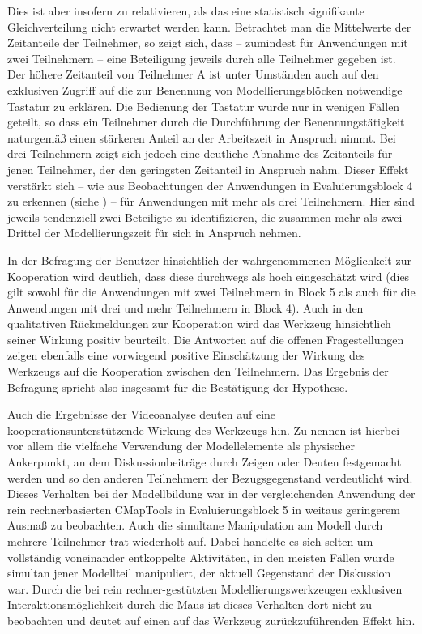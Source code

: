 Dies ist aber insofern zu relativieren, als das eine statistisch signifikante Gleichverteilung nicht erwartet werden kann. Betrachtet man die Mittelwerte der Zeitanteile der Teilnehmer, so zeigt sich, dass -- zumindest für Anwendungen mit zwei Teilnehmern -- eine Beteiligung jeweils durch alle Teilnehmer gegeben ist. Der höhere Zeitanteil von Teilnehmer A ist unter Umständen auch auf den exklusiven Zugriff auf die zur Benennung von Modellierungsblöcken notwendige Tastatur zu erklären. Die Bedienung der Tastatur wurde nur in wenigen Fällen geteilt, so dass ein Teilnehmer durch die Durchführung der Benennungstätigkeit naturgemäß einen stärkeren Anteil an der Arbeitszeit in Anspruch nimmt. Bei drei Teilnehmern zeigt sich jedoch eine deutliche Abnahme des Zeitanteils für jenen Teilnehmer, der den geringsten Zeitanteil in Anspruch nahm. Dieser Effekt verstärkt sich -- wie aus Beobachtungen der Anwendungen in Evaluierungsblock 4 zu erkennen (siehe \citep{Wahlmuller10}) -- für Anwendungen mit mehr als drei Teilnehmern. Hier sind jeweils tendenziell zwei Beteiligte zu identifizieren, die zusammen mehr als zwei Drittel der Modellierungszeit für sich in Anspruch nehmen.  

In der Befragung der Benutzer hinsichtlich der wahrgenommenen Möglichkeit zur Kooperation wird deutlich, dass diese durchwegs als hoch eingeschätzt wird (dies gilt sowohl für die Anwendungen mit zwei Teilnehmern in Block 5 als auch für die Anwendungen mit drei und mehr Teilnehmern in Block 4). Auch in den qualitativen Rückmeldungen zur Kooperation wird das Werkzeug hinsichtlich seiner Wirkung positiv beurteilt. Die Antworten auf die offenen Fragestellungen zeigen ebenfalls eine vorwiegend positive Einschätzung der Wirkung des Werkzeugs auf die Kooperation zwischen den Teilnehmern. Das Ergebnis der Befragung spricht also insgesamt für die Bestätigung der Hypothese.

Auch die Ergebnisse der Videoanalyse deuten auf eine kooperationsunterstützende Wirkung des Werkzeugs hin. Zu nennen ist hierbei vor allem die vielfache Verwendung der Modellelemente als physischer Ankerpunkt, an dem Diskussionbeiträge durch Zeigen oder Deuten festgemacht werden und so den anderen Teilnehmern der Bezugsgegenstand verdeutlicht wird. Dieses Verhalten bei der Modellbildung war in der vergleichenden Anwendung der rein rechnerbasierten CMapTools in Evaluierungsblock 5 in weitaus geringerem Ausmaß zu beobachten. Auch die simultane Manipulation am Modell durch mehrere Teilnehmer trat wiederholt auf. Dabei handelte es sich selten um vollständig voneinander entkoppelte Aktivitäten, in den meisten Fällen wurde simultan jener Modellteil manipuliert, der aktuell Gegenstand der Diskussion war. Durch die bei rein rechner-gestützten Modellierungswerkzeugen exklusiven Interaktionsmöglichkeit durch die Maus ist dieses Verhalten dort nicht zu beobachten und deutet auf einen auf das Werkzeug zurückzuführenden Effekt hin.   

